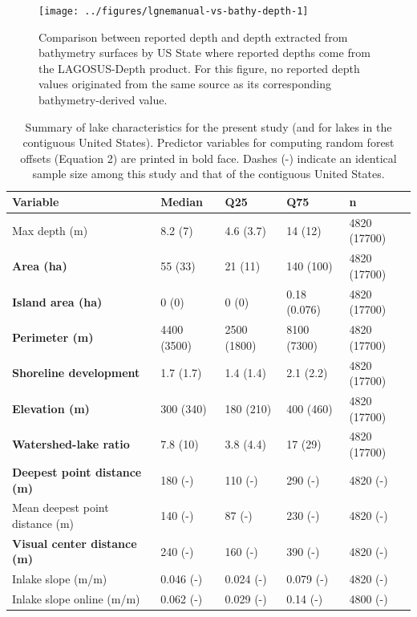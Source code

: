 \documentclass[draft,wrr]{agutexSI2019}
\begin{document}
\begin{figure}
      \begin{center}\texttt{[image: ../figures/lgnemanual-vs-bathy-depth-1]}\end{center}
      \caption{Comparison between reported depth and depth extracted from bathymetry surfaces by US State where reported depths come from the LAGOSUS-Depth product. For this figure, no reported depth values originated from the same source as its corresponding bathymetry-derived value.}\label{figS8}
      \end{figure}

\clearpage

\begin{table}
\caption{Summary of lake characteristics for the present study (and for lakes in the contiguous United States). Predictor variables for computing random forest offsets (Equation 2) are printed in bold face. Dashes (-) indicate an identical sample size among this study and that of the contiguous United States.} \label{tableS1}
\centering
\setlength\tabcolsep{1.5pt} %
\begin{tabular}{lllll}
\hline
Variable & Median & Q25 & Q75 & n\\
\hline
Max depth (m) & 8.2 (7) & 4.6 (3.7) & 14 (12) & 4820 (17700)\\
\textbf{Area (ha)} & 55 (33) & 21 (11) & 140 (100) & 4820 (17700)\\
\textbf{Island area (ha)} & 0 (0) & 0 (0) & 0.18 (0.076) & 4820 (17700)\\
\textbf{Perimeter (m)} & 4400 (3500) & 2500 (1800) & 8100 (7300) & 4820 (17700)\\
\textbf{Shoreline development} & 1.7 (1.7) & 1.4 (1.4) & 2.1 (2.2) & 4820 (17700)\\
\textbf{Elevation (m)} & 300 (340) & 180 (210) & 400 (460) & 4820 (17700)\\
\textbf{Watershed-lake ratio} & 7.8 (10) & 3.8 (4.4) & 17 (29) & 4820 (17700)\\
\textbf{Deepest point distance (m)} & 180 (-) & 110 (-) & 290 (-) & 4820 (-)\\
Mean deepest point distance (m) & 140 (-) & 87 (-) & 230 (-) & 4820 (-)\\
\textbf{Visual center distance (m)} & 240 (-) & 160 (-) & 390 (-) & 4820 (-)\\
Inlake slope (m/m) & 0.046 (-) & 0.024 (-) & 0.079 (-) & 4820 (-)\\
Inlake slope online (m/m) & 0.062 (-) & 0.029 (-) & 0.14 (-) & 4800 (-)\\

\end{tabular}
\end{table}
\end{document}
